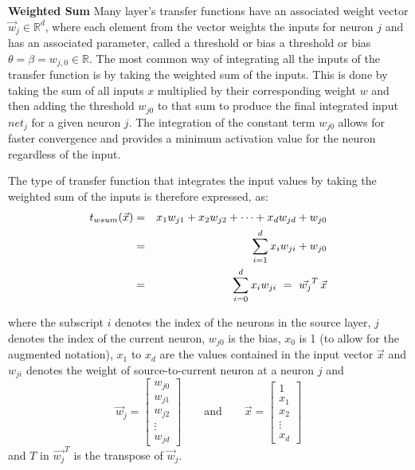 \textbf{Weighted Sum}
\label{sec:weightedsum}
Many layer's transfer functions have an associated weight vector $\vec{w}_j\in \mathbb{R}^d$, where each element from the vector weights the inputs for neuron $j$ and has an associated parameter, called a threshold or bias a threshold or bias $\theta= \beta= w_{j,0}\in \mathbb{R}$. The most common way of integrating all the inputs of the transfer function is by taking the weighted sum of the inputs. This is done by taking the sum of all inputs $x$ multiplied by their corresponding weight $w$ and then adding the threshold $w_{j 0}$ to that sum to produce the final integrated input $net_j$ for a given neuron $j$. The integration of the constant term $w_{j 0}$ allows for faster convergence and provides a minimum activation value for the neuron regardless of the input. 

The type of transfer function that integrates the input values by taking the weighted sum of the inputs is therefore expressed, as:
\begin{eqnarray}
    \notag t_{wsum}(\vec{x}) & = & x_{1} w_{j 1}+x_{2} w_{j 2}+\cdots+x_{d} w_{j d}+w_{j 0} \\
    \notag & = & \sum_{i=1}^{d} x_{i} w_{j i}+w_{j 0} \\
     & = & \sum_{i=0}^{d} x_{i} w_{j i} \ = \  \vec{{w}_j}^T\, \vec{x}
    \label{eq:weightredsum}
\end{eqnarray}

where the subscript $i$ denotes the index of the neurons in the source layer, $j$ denotes the index of the current neuron, $w_{j0}$ is the bias, $x_0$ is 1 (to allow for the augmented notation), $x_1$ to $x_d$ are the values contained in the input vector $\vec{x}$ and $w_{ji}$ denotes the weight of source-to-current neuron at a neuron $j$ and 
\begin{equation*}
  \vec{w}_{j}=\left[\begin{matrix}w_{j 0}\\ w_{j 1} \\ w_{j 2} \\ \vdots  \\ w_{j d }\end{matrix}\right] 
  \qquad \mbox{and}\qquad
  \vec{x}=\left[\begin{matrix} 1\\ x_{1} \\ x_{2} \\ \vdots \\ x_{d} \end{matrix}\right]
\end{equation*}
and ${T}$ in $\vec{{w}_j}^T$ is the transpose of $\vec{w}_{j}$.


